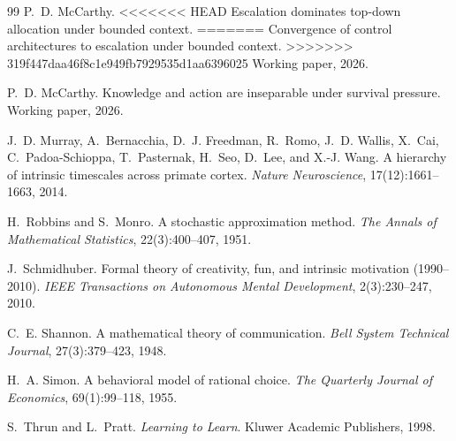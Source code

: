 \documentclass[11pt]{article}
\theoremstyle{definition}
\begin{document}
\begin{thebibliography}{99}
P.~D. McCarthy.
<<<<<<< HEAD
\newblock Escalation dominates top-down allocation under bounded context.
=======
\newblock Convergence of control architectures to escalation under bounded context.
>>>>>>> 319f447daa46f8c1e949fb7929535d1aa6396025
\newblock Working paper, 2026.

P.~D. McCarthy.
\newblock Knowledge and action are inseparable under survival pressure.
\newblock Working paper, 2026.

J.~D. Murray, A.~Bernacchia, D.~J. Freedman, R.~Romo, J.~D. Wallis,
  X.~Cai, C.~Padoa-Schioppa, T.~Pasternak, H.~Seo, D.~Lee, and
  X.-J. Wang.
\newblock A hierarchy of intrinsic timescales across primate cortex.
\newblock \emph{Nature Neuroscience}, 17(12):1661--1663, 2014.

H.~Robbins and S.~Monro.
\newblock A stochastic approximation method.
\newblock \emph{The Annals of Mathematical Statistics}, 22(3):400--407, 1951.

J.~Schmidhuber.
\newblock Formal theory of creativity, fun, and intrinsic motivation
  (1990--2010).
\newblock \emph{IEEE Transactions on Autonomous Mental Development},
  2(3):230--247, 2010.

C.~E. Shannon.
\newblock A mathematical theory of communication.
\newblock \emph{Bell System Technical Journal}, 27(3):379--423, 1948.

H.~A. Simon.
\newblock A behavioral model of rational choice.
\newblock \emph{The Quarterly Journal of Economics}, 69(1):99--118, 1955.

S.~Thrun and L.~Pratt.
\newblock \emph{Learning to Learn}.
\newblock Kluwer Academic Publishers, 1998.

\end{thebibliography}
\end{document}
